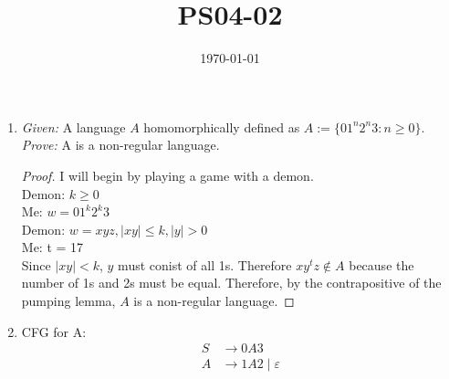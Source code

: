\documentclass{article}
\title{PS04-02}
\date{\today}
\begin{document}
\maketitle

\begin{enumerate}[label=\alph*.]
	\item \textit{Given: } A language $A$ homomorphically defined as $A := \{01^n2^n3 : n \geq 0\}$.\\
	\textit{Prove: } A is a non-regular language.
	\begin{proof}
	I will begin by playing a game with a demon.\\
	Demon: $k \geq 0$\\
	Me: $w = 01^k2^k3$\\
	Demon: $w = xyz, \mid xy \mid \leq k, \mid y \mid > 0$\\
	Me: t = 17\\
	Since $\mid xy \mid < k$, $y$ must conist of all 1s. Therefore $xy^tz \notin A$ because the number of 1s and 2s must be equal. Therefore, by the contrapositive of the pumping lemma, $A$ is a non-regular language. 
	\end{proof}
	\item CFG for A:\\
	\begin{align*}
		S &\rightarrow 0A3\\
		A &\rightarrow 1A2 \mid \varepsilon
	\end{align*}
\end{enumerate}
\end{document}
